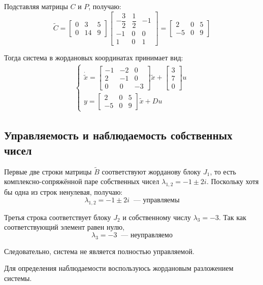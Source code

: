 \documentclass[a4paper,12pt]{article}
\begin{document}
Подставляя матрицы $C$ и $P$, получаю:
\[
\tilde{C} =
\begin{bmatrix}
	0 & 3 & 5 \\
	0 & 14 & 9
\end{bmatrix}
\begin{bmatrix}
	-\dfrac{3}{2} & \dfrac{1}{2} & -1 \\
	-1 & 0 & 0 \\
	1 & 0 & 1
\end{bmatrix}
=
\begin{bmatrix}
	2 & 0 & 5 \\
	-5 & 0 & 9
\end{bmatrix}
\]

Тогда система в жордановых координатах принимает вид:
\[
\begin{aligned}
	\begin{cases}
		\dot{\tilde{x}} =
		\begin{bmatrix}
			-1 & -2 & 0 \\
			2 & -1 & 0 \\
			0 & 0 & -3
		\end{bmatrix}
		\tilde{x}
		+
		\begin{bmatrix}
			3 \\
			7 \\
			0
		\end{bmatrix}u \\[25pt]
		y =
		\begin{bmatrix}
			2 & 0 & 5 \\
			-5 & 0 & 9
		\end{bmatrix}
		\tilde{x}
		+ Du
	\end{cases}
\end{aligned}
\]

	
	\subsection{Управляемость и наблюдаемость собственных чисел}
	
	
	Первые две строки матрицы $\tilde{B}$ соответствуют жорданову блоку
	$J_1$, то есть комплексно-сопряжённой паре собственных чисел
	$\lambda_{1,2}=-1\pm2i$. Поскольку хотя бы одна из строк ненулевая,
	получаю:
	\[
	\lambda_{1,2}=-1\pm2i \;\; \text{--- управляемы}
	\]
	
	Третья строка соответствует блоку $J_2$ и собственному числу
	$\lambda_3=-3$. Так как соответствующий элемент равен нулю,
	\[
	\lambda_3=-3 \;\; \text{--- неуправляемо}
	\]
	
	Следовательно, система не является полностью управляемой. \\
	\par		
	Для определения наблюдаемости воспользуюсь жордановым разложением системы.
\end{document}
